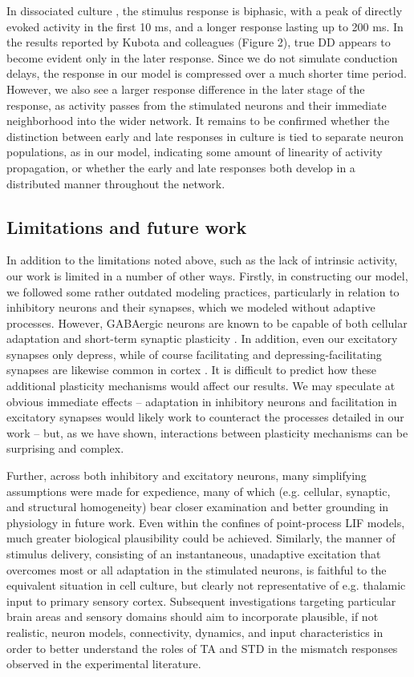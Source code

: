 \documentclass[9pt,lineno,onehalfspacing]{elife}
\begin{document}
In dissociated culture \citep{Kubota2021-dx}, the stimulus response is biphasic, with a peak of directly evoked activity in the first 10 ms, and a longer response lasting up to 200 ms. In the results reported by Kubota and colleagues (Figure 2), true DD appears to become evident only in the later response. Since we do not simulate conduction delays, the response in our model is compressed over a much shorter time period. However, we also see a larger response difference in the later stage of the response, as activity passes from the stimulated neurons and their immediate neighborhood into the wider network. It remains to be confirmed whether the distinction between early and late responses in culture is tied to separate neuron populations, as in our model, indicating some amount of linearity of activity propagation, or whether the early and late responses both develop in a distributed manner throughout the network.

\subsection{Limitations and future work}

In addition to the limitations noted above, such as the lack of intrinsic activity, our work is limited in a number of other ways.
Firstly, in constructing our model, we followed some rather outdated modeling practices, particularly in relation to inhibitory neurons and their synapses, which we modeled without adaptive processes. However, GABAergic neurons are known to be capable of both cellular adaptation and short-term synaptic plasticity \citep{Perrenoud2013-fo,Markram2004-fb,Gupta2000-jh}. In addition, even our excitatory synapses only depress, while of course facilitating and depressing-facilitating synapses are likewise common in cortex \citep{Tsodyks1997-qt,Varela1997-nr}. It is difficult to predict how these additional plasticity mechanisms would affect our results. We may speculate at obvious immediate effects -- adaptation in inhibitory neurons and facilitation in excitatory synapses would likely work to counteract the processes detailed in our work -- but, as we have shown, interactions between plasticity mechanisms can be surprising and complex.

Further, across both inhibitory and excitatory neurons, many simplifying assumptions were made for expedience, many of which (e.g. cellular, synaptic, and structural homogeneity) bear closer examination and better grounding in physiology in future work. Even within the confines of point-process LIF models, much greater biological plausibility could be achieved.
Similarly, the manner of stimulus delivery, consisting of an instantaneous, unadaptive excitation that overcomes most or all adaptation in the stimulated neurons, is faithful to the equivalent situation in cell culture, but clearly not representative of e.g. thalamic input to primary sensory cortex.
Subsequent investigations targeting particular brain areas and sensory domains should aim to incorporate plausible, if not realistic, neuron models, connectivity, dynamics, and input characteristics in order to better understand the roles of TA and STD in the mismatch responses observed in the experimental literature.
\end{document}
